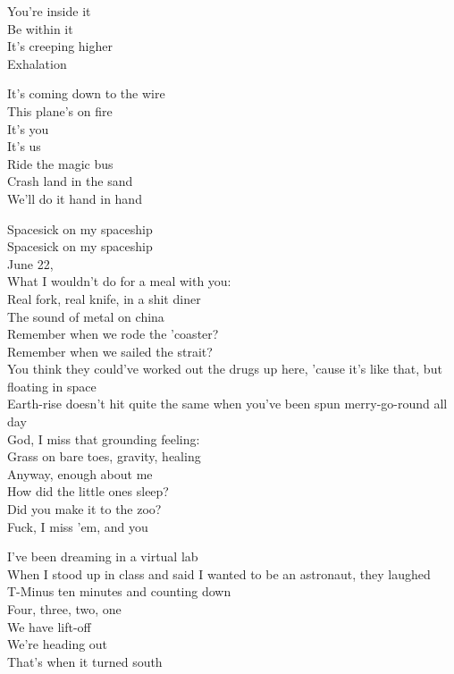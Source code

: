 You're inside it\\
Be within it\\
It's creeping higher\\
Exhalation\\


It's coming down to the wire\\
This plane's on fire\\
It's you\\
It's us\\
Ride the magic bus\\
Crash land in the sand\\
We'll do it hand in hand\\




Spacesick on my spaceship\\
Spacesick on my spaceship\\

June 22,\\
What I wouldn't do for a meal with you:\\
Real fork, real knife, in a shit diner\\
The sound of metal on china\\
Remember when we rode the 'coaster?\\
Remember when we sailed the strait?\\
You think they could've worked out the drugs up here, 'cause it's like that, but floating in space\\

Earth-rise doesn't hit quite the same when you've been spun merry-go-round all day\\
God, I miss that grounding feeling:\\
Grass on bare toes, gravity, healing\\
Anyway, enough about me\\
How did the little ones sleep?\\
Did you make it to the zoo?\\
Fuck, I miss 'em, and you\\


I've been dreaming in a virtual lab\\
When I stood up in class and said I wanted to be an astronaut, they laughed\\
T-Minus ten minutes and counting down\\
Four, three, two, one\\
We have lift-off\\
We're heading out\\
That's when it turned south\\

